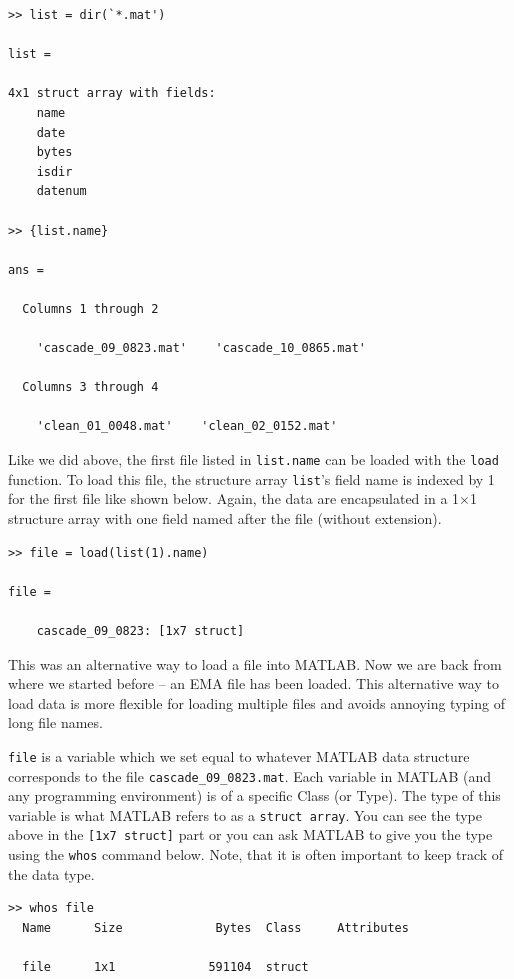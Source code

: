 \documentclass[a4paper, 12pt]{article}
\begin{document}
\begin{verbatim}
>> list = dir(`*.mat')

list = 

4x1 struct array with fields:
    name
    date
    bytes
    isdir
    datenum

>> {list.name}

ans = 

  Columns 1 through 2

    'cascade_09_0823.mat'    'cascade_10_0865.mat'

  Columns 3 through 4

    'clean_01_0048.mat'    'clean_02_0152.mat'
\end{verbatim}

Like we did above, the first file listed in \texttt{list.name} can be loaded with the \texttt{load} function. To load this file, the structure array \texttt{list}'s field name is indexed by 1 for the first file like shown below. Again, the data are encapsulated in a 1$\times$1 structure array with one field named after the file (without extension). 

\begin{verbatim}
>> file = load(list(1).name)

file = 

    cascade_09_0823: [1x7 struct]
\end{verbatim}

This was an alternative way to load a file into MATLAB. Now we are back from where we started before -- an EMA file has been loaded. This alternative way to load data is more flexible for loading multiple files and avoids annoying typing of long file names.\par %


\texttt{file} is a variable which we set equal to whatever MATLAB data structure corresponds to the file \texttt{cascade\_09\_0823.mat}. Each variable in MATLAB (and any programming environment) is of a specific Class (or Type). The type of this variable is what MATLAB refers to as a \texttt{struct array}. You can see the type above in the \texttt{[1x7 struct]} part or you can ask MATLAB to give you the type using the \texttt{whos} command below. Note, that it is often important to keep track of the data type.

\begin{verbatim}
>> whos file
  Name      Size             Bytes  Class     Attributes

  file      1x1             591104  struct              
\end{verbatim}
\end{document}
